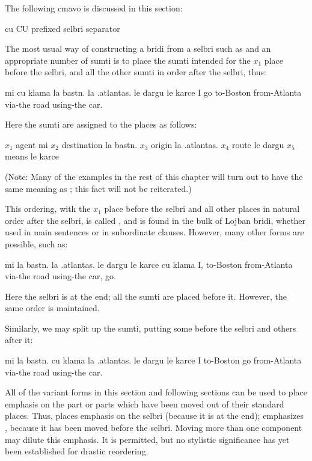 The following cmavo is discussed in this section:

   cu  CU  prefixed selbri separator

The most usual way of constructing a bridi from a selbri such
    as  and an appropriate number of sumti is to place the
    sumti intended for the $x_1$ place before the selbri, and all the
    other sumti in order after the selbri, thus:
\begin{example}
mi cu klama la bastn. la .atlantas.\n
\T	le dargu le karce\n
I go to-Boston from-Atlanta\n
\T	via-the road using-the car.
\end{example}

Here the sumti are assigned to the places as follows:

   $x_1$  agent       mi
    $x_2$  destination la bastn.
    $x_3$  origin      la .atlantas.
    $x_4$  route       le dargu
    $x_5$  means       le karce

(Note: Many of the examples in the rest of this chapter will
    turn out to have the same meaning as ; this fact will not be reiterated.) 

This ordering, with the $x_1$ place before the selbri and all
    other places in natural order after the selbri, is called
    , and is found in the bulk of Lojban
    bridi, whether used in main sentences or in subordinate
    clauses. However, many other forms are possible, such as:
\begin{example}
mi la bastn. la .atlantas. le dargu\n
\T	le karce cu klama\n
I, to-Boston from-Atlanta via-the road\n
\T	using-the car, go.
\end{example}

Here the selbri is at the end; all the sumti are placed before
    it. However, the same order is maintained. 

Similarly, we may split up the sumti, putting some before
    the selbri and others after it:
\begin{example}
mi la bastn. cu klama la .atlantas. le dargu le karce\n
I to-Boston go from-Atlanta via-the road using-the car.
\end{example}

All of the variant forms in this section and following sections
    can be used to place emphasis on the part or parts which have
    been moved out of their standard places. Thus,  places emphasis on the selbri
    (because it is at the end); 
    emphasizes , because it has been moved before the
    selbri. Moving more than one component may dilute this
    emphasis. It is permitted, but no stylistic significance has
    yet been established for drastic reordering. 

